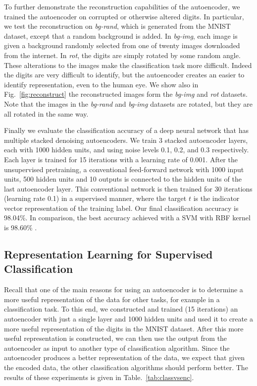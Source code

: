 To further demonstrate the reconstruction capabilities of the autoencoder, we
trained the autoencoder on corrupted or otherwise altered digits.  In
particular, we test the reconstruction on \textit{bg-rand}, which is generated
from the MNIST dataset, except that a random background is added. In
\textit{bg-img}, each image is given a background randomly selected from one of
twenty images downloaded from the internet. In \textit{rot}, the digits are
simply rotated by some random angle.  These alterations to the images make the
classification task more difficult. Indeed the digits are very difficult to
identify, but the autoencoder creates an easier to identify representation,
even to the human eye. We show also in Fig.~\ref{fig:reconstruct} the
reconstructed images form the \textit{bg-img} and \textit{rot} datasets. Note
that the images in the \textit{bg-rand} and \textit{bg-img} datasets are
rotated, but they are all rotated in the same way.

Finally we evaluate the classification accuracy of a deep neural network that
has multiple stacked denoising autoencoders. We train 3 stacked autoencoder
layers, each with 1000 hidden units, and using noise levels 0.1, 0.2, and 0.3
respectively. Each layer is trained for 15 iterations with a learning rate of
0.001. After the unsupervised pretraining, a conventional feed-forward network
with 1000 input units, 500 hidden units and 10 outputs is connected to the
hidden units of the last autoencoder layer. This conventional network is then
trained for 30 iterations (learning rate 0.1) in a supervised manner, where the
target $t$ is the indicator vector representation of the training label. Our
final classification accuracy is 98.04\%. In comparison, the best accuracy achieved
with a SVM with RBF kernel is 98.60\% \cite{vincent2010stacked}.

\subsection{Representation Learning for Supervised Classification}

Recall that one of the main reasons for using an autoencoder is to determine a
more useful representation of the data for other tasks, for example in a
classification task. To this end, we constructed and trained (15 iterations) an
autoencoder with just a single layer and 1000 hidden units and used it to
create a more useful representation of the digits in the MNIST dataset. After
this more useful representation is constructed, we can then use the output from
the autoencoder as input to another type of classification algorithm.  Since
the autoencoder produces a better representation of the data, we expect that
given the encoded data, the other classification algorithms should perform
better.  The results of these experiments is given in
Table.~\ref{tab:classvsenc}.


